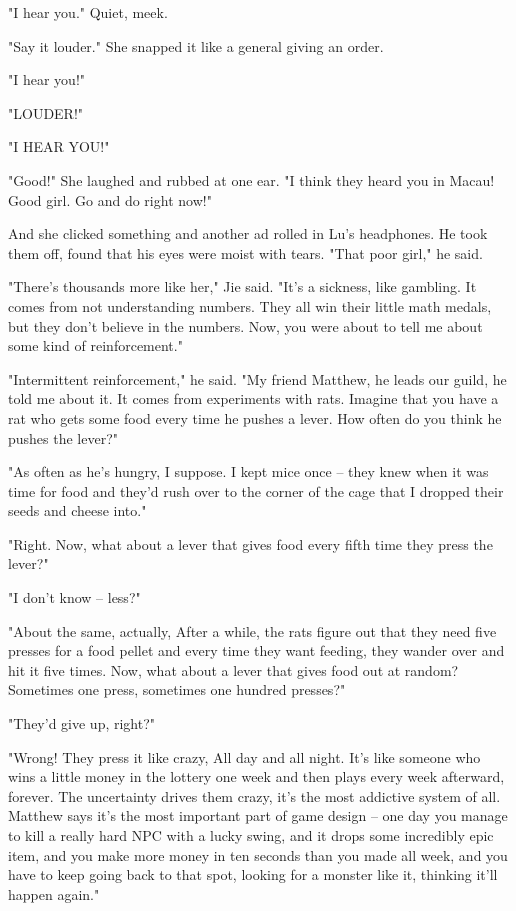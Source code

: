 "I hear you." Quiet, meek.

"Say it louder." She snapped it like a general giving an order.

"I hear you!"

"LOUDER!"

"I HEAR YOU!"

"Good!" She laughed and rubbed at one ear. "I think they heard you
in Macau! Good girl. Go and do right now!"

And she clicked something and another ad rolled in Lu's headphones.
He took them off, found that his eyes were moist with tears. "That
poor girl," he said.

"There's thousands more like her," Jie said. "It's a sickness, like
gambling. It comes from not understanding numbers. They all win
their little math medals, but they don't believe in the numbers.
Now, you were about to tell me about some kind of reinforcement."

"Intermittent reinforcement," he said. "My friend Matthew, he leads
our guild, he told me about it. It comes from experiments with
rats. Imagine that you have a rat who gets some food every time he
pushes a lever. How often do you think he pushes the lever?"

"As often as he's hungry, I suppose. I kept mice once -- they knew
when it was time for food and they'd rush over to the corner of the
cage that I dropped their seeds and cheese into."

"Right. Now, what about a lever that gives food every fifth time
they press the lever?"

"I don't know -- less?"

"About the same, actually, After a while, the rats figure out that
they need five presses for a food pellet and every time they want
feeding, they wander over and hit it five times. Now, what about a
lever that gives food out at random? Sometimes one press, sometimes
one hundred presses?"

"They'd give up, right?"

"Wrong! They press it like crazy, All day and all night. It's like
someone who wins a little money in the lottery one week and then
plays every week afterward, forever. The uncertainty drives them
crazy, it's the most addictive system of all. Matthew says it's the
most important part of game design -- one day you manage to kill a
really hard NPC with a lucky swing, and it drops some incredibly
epic item, and you make more money in ten seconds than you made all
week, and you have to keep going back to that spot, looking for a
monster like it, thinking it'll happen again."

